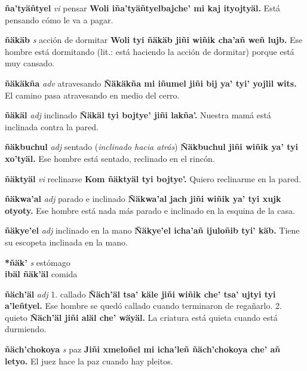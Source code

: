 \documentclass[10pt]{scrbook}
\newcommand{\entry}[1]{\textbf{#1}}
\newcommand{\onedefinition}[1]{#1.}
\newcommand{\partofspeech}[1]{\textit{#1}}
\newcommand{\spanishtranslation}[1]{#1}
\newcommand{\clarification}[1]{(\textit{#1})}
\newcommand{\cholexample}[1]{\textbf{#1}}
\newcommand{\exampletranslation}[1]{#1}
\newcommand{\secondaryentry}[1]{\\\textbf{#1}}
\newcommand{\secondtranslation}[1]{#1}
\begin{document}
\begin{multicols}{2}
\entry{ña'tyäñtyel}
\partofspeech{vi}
\spanishtranslation{pensar}
\cholexample{Woli iña'tyäñtyelbajche' mi kaj ityojtyäl.}
\exampletranslation{Está pensando cómo le va a pagar.}

\entry{ñäkäb}
\partofspeech{s}
\spanishtranslation{acción de dormitar}
\cholexample{Woli tyi ñäkäb jiñi wiñik cha'añ weñ lujb.}
\exampletranslation{Ese hombre está dormitando (lit.: está haciendo la acción de dormitar) porque está muy cansado.}

\entry{ñäkäkña}
\partofspeech{adv}
\spanishtranslation{atravesando}
\cholexample{Ñäkäkña mi iñumel jiñi bij ya' tyi' yojlil wits.}
\exampletranslation{El camino pasa atravesando en medio del cerro.}

\entry{ñäkäl}
\partofspeech{adj}
\spanishtranslation{inclinado}
\cholexample{Ñäkäl tyi bojtye' jiñi lakña'.}
\exampletranslation{Nuestra mamá está inclinada contra la pared.}

\entry{ñäkbuchul}
\partofspeech{adj}
\spanishtranslation{sentado}
\clarification{inclinado hacia atrás}
\cholexample{Ñäkbuchul jiñi wiñik ya' tyi xo'tyäl.}
\exampletranslation{Ese hombre está sentado, reclinado en el rincón.}

\entry{ñäktyäl}
\partofspeech{vi}
\spanishtranslation{reclinarse}
\cholexample{Kom ñäktyäl tyi bojtye'.}
\exampletranslation{Quiero reclinarme en la pared.}

\entry{ñäkwa'al}
\partofspeech{adj}
\spanishtranslation{parado e inclinado}
\cholexample{Ñäkwa'al jach jiñi wiñik ya' tyi xujk otyoty.}
\exampletranslation{Ese hombre está nada más parado e inclinado en la esquina de la casa.}

\entry{ñäkye'el}
\partofspeech{adj}
\spanishtranslation{inclinado en la mano}
\cholexample{Ñäkye'el icha'añ ijuloñib tyi' käb.}
\exampletranslation{Tiene su escopeta inclinada en la mano.}

\entry{*ñäk'}
\partofspeech{s}
\spanishtranslation{estómago}
\secondaryentry{ibäl ñäk'äl}
\secondtranslation{comida}

\entry{ñäch'äl}
\partofspeech{adj}
\onedefinition{1}
\spanishtranslation{callado}
\cholexample{Ñäch'äl tsa' käle jiñi wiñik che' tsa' ujtyi tyi a'leñtyel.}
\exampletranslation{Ese hombre se quedó callado cuando terminaron de regañarlo.}
\onedefinition{2}
\spanishtranslation{quieto}
\cholexample{Ñäch'äl jiñi aläl che' wäyäl.}
\exampletranslation{La criatura está quieta cuando está durmiendo.}

\entry{ñäch'chokoya}
\partofspeech{s}
\spanishtranslation{paz}
\cholexample{Jiñi xmeloñel mi icha'leñ ñäch'chokoya che' añ letyo.}
\exampletranslation{El juez hace la paz cuando hay pleitos.}


\end{multicols}
\end{document}
